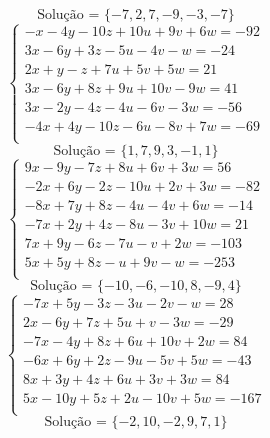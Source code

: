 \documentclass[12pt,oneside,a4paper]{article}
\begin{document}
\begin{equation*}
\text{Solução = }\{-7,2,7,-9,-3,-7\}
\end{equation*}
\vspace{\baselineskip}
\begin{equation*}
\begin{cases}
-x-4y-10z+10u+9v+6w=-92 \\
3x-6y+3z-5u-4v-w=-24 \\
2x+y-z+7u+5v+5w=21 \\
3x-6y+8z+9u+10v-9w=41 \\
3x-2y-4z-4u-6v-3w=-56 \\
-4x+4y-10z-6u-8v+7w=-69 \\
\end{cases}
\end{equation*}
\begin{equation*}
\text{Solução = }\{1,7,9,3,-1,1\}
\end{equation*}
\vspace{\baselineskip}
\begin{equation*}
\begin{cases}
9x-9y-7z+8u+6v+3w=56 \\
-2x+6y-2z-10u+2v+3w=-82 \\
-8x+7y+8z-4u-4v+6w=-14 \\
-7x+2y+4z-8u-3v+10w=21 \\
7x+9y-6z-7u-v+2w=-103 \\
5x+5y+8z-u+9v-w=-253 \\
\end{cases}
\end{equation*}
\begin{equation*}
\text{Solução = }\{-10,-6,-10,8,-9,4\}
\end{equation*}
\vspace{\baselineskip}
\begin{equation*}
\begin{cases}
-7x+5y-3z-3u-2v-w=28 \\
2x-6y+7z+5u+v-3w=-29 \\
-7x-4y+8z+6u+10v+2w=84 \\
-6x+6y+2z-9u-5v+5w=-43 \\
8x+3y+4z+6u+3v+3w=84 \\
5x-10y+5z+2u-10v+5w=-167 \\
\end{cases}
\end{equation*}
\begin{equation*}
\text{Solução = }\{-2,10,-2,9,7,1\}
\end{equation*}
\end{document}
